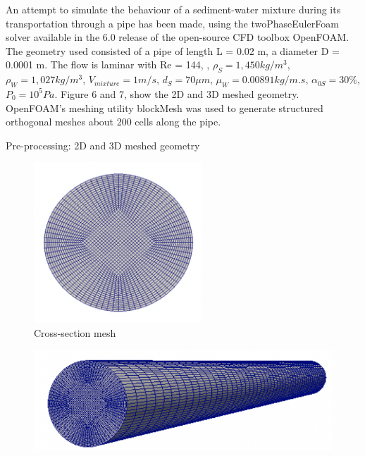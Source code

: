 \documentclass[11pt]{report}
\begin{document}
\begin{minipage}[t]{0.35\textwidth}
\begin{minipage}[t]{0.5\textwidth}
\begin{minipage}[t]{0.35\textwidth}
\begin{minipage}[t]{0.35\textwidth}
An attempt to simulate the behaviour of a sediment-water mixture during its transportation through a pipe has been made, using the twoPhaseEulerFoam solver available in the 6.0 release of the open-source CFD toolbox OpenFOAM. 
%
The geometry used consisted of a pipe of length L = 0.02 m, a diameter D = 0.0001 m. 
%
The flow is laminar with Re = 144,  , $\rho_S= 1,450  kg/m^3$, $\rho_W= 1,027  kg/m^3$, $V_{mixture} = 1 m/s$, $d_S= 70 \mu m$, $\mu_W = 0.00891  kg/m.s$, $\alpha_{0S} = 30 \%$, $P_0=10^5  Pa$. 
%
Figure 6 and 7, show the 2D and 3D meshed geometry. OpenFOAM's meshing utility blockMesh was used to generate structured orthogonal meshes about 200 cells along the pipe.
%
\begin{itemize}
 \bf{\item Pre-processing: 2D and 3D meshed geometry}
  \end{itemize}
 \vspace{0.5cm}
\vspace{-0.6cm}
\begin{figure}[ht!]
 \begin{center}
 
 \includegraphics[trim=0cm 0cm 0cm 0cm,clip,scale=0.6]{figs/1.png}
 \caption{ Cross-section mesh}
 \label{fig:gauss}
 \end{center}
 \end{figure} 
%
 \begin{figure}[ht!]
 \begin{center}
 
 \includegraphics[trim=0cm 0cm 0cm 0cm,clip,scale=0.6]{figs/2.png}

\end{center}
\end{figure}
\end{minipage}
\end{minipage}
\end{minipage}
\end{minipage}
\end{document}
